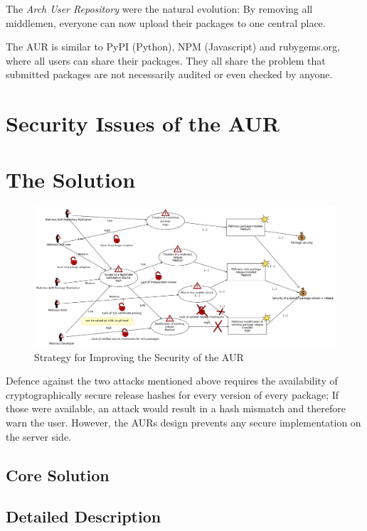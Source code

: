 \documentclass{scrartcl}
\begin{document}
  The \emph{Arch User Repository} were the natural evolution: By removing all middlemen, everyone can now upload their packages to one central place. \cite{wiki:AUR}

  The AUR is similar to PyPI (Python), NPM (Javascript) and rubygems.org, where all users can share their packages. They all share the problem that submitted packages are not necessarily audited or even checked by anyone.

  \section{Security Issues of the AUR} %

  \section{The Solution} %
    \begin{figure}
      \includegraphics[width=\paperwidth]{img/threat2.png}
      \caption[Threat Prevention Strategy]{Strategy for Improving the Security of the AUR}
      \label{fig:threat2}
    \end{figure}

    Defence against the two attacks mentioned above requires the availability of cryptographically secure release hashes for every version of every package; If those were available, an attack would result in a hash mismatch and therefore warn the user. However, the AURs design prevents any secure implementation on the server side.

    \subsection{Core Solution}  %
    \subsection{Detailed Description} %
    
\end{document}
